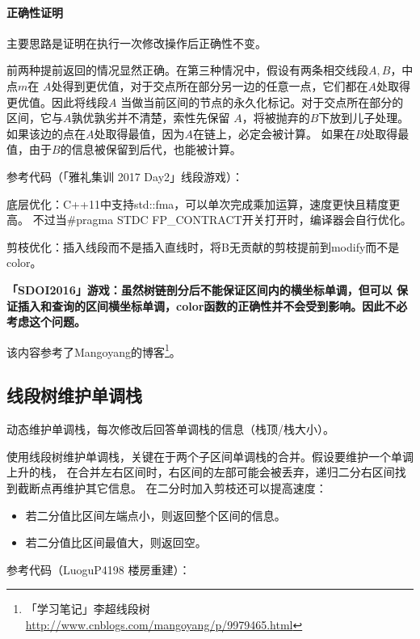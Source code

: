 \paragraph{正确性证明} 主要思路是证明在执行一次修改操作后正确性不变。

前两种提前返回的情况显然正确。在第三种情况中，假设有两条相交线段$A,B$，中点$m$在
$A$处得到更优值，对于交点所在部分另一边的任意一点，它们都在$A$处取得更优值。因此将线段$A$
当做当前区间的节点的永久化标记。对于交点所在部分的区间，它与$A$孰优孰劣并不清楚，索性先保留
$A$，将被抛弃的$B$下放到儿子处理。如果该边的点在$A$处取得最值，因为$A$在链上，必定会被计算。
如果在$B$处取得最值，由于$B$的信息被保留到后代，也能被计算。

参考代码（「雅礼集训 2017 Day2」线段游戏）：


底层优化：C++11中支持std::fma，可以单次完成乘加运算，速度更快且精度更高。
不过当\#pragma STDC FP\_CONTRACT开关打开时，编译器会自行优化。

剪枝优化：插入线段而不是插入直线时，将B无贡献的剪枝提前到modify而不是color。

{\bfseries 「SDOI2016」游戏：虽然树链剖分后不能保证区间内的横坐标单调，但可以
保证插入和查询的区间横坐标单调，color函数的正确性并不会受到影响。因此不必考虑这个问题。}

该内容参考了Mangoyang的博客\footnote{
    「学习笔记」李超线段树
    \url{http://www.cnblogs.com/mangoyang/p/9979465.html}
}。
\subsection{线段树维护单调栈}
动态维护单调栈，每次修改后回答单调栈的信息（栈顶/栈大小）。

使用线段树维护单调栈，关键在于两个子区间单调栈的合并。假设要维护一个单调上升的栈，
在合并左右区间时，右区间的左部可能会被丢弃，递归二分右区间找到截断点再维护其它信息。
在二分时加入剪枝还可以提高速度：
\begin{itemize}
    \item 若二分值比区间左端点小，则返回整个区间的信息。
    \item 若二分值比区间最值大，则返回空。
\end{itemize}

参考代码（LuoguP4198 楼房重建）：


